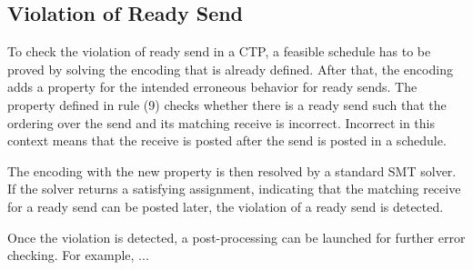 

\subsection{Violation of Ready Send}

To check the violation of ready send in a CTP, a feasible schedule has to be proved by solving the encoding that is already defined. After that, the encoding adds a property for the intended erroneous behavior for ready sends. The property defined in rule (9) checks whether there is a ready send such that the ordering over the send and its matching receive is incorrect. Incorrect in this context means that the receive is posted after the send is posted in a schedule.

\encodingready

The encoding with the new property is then resolved by a standard SMT solver. If the solver returns a satisfying assignment, indicating that the matching receive for a ready send can be posted later, the violation of a ready send is detected.

Once the violation is detected, a post-processing can be launched for further error checking. For example, ... 






